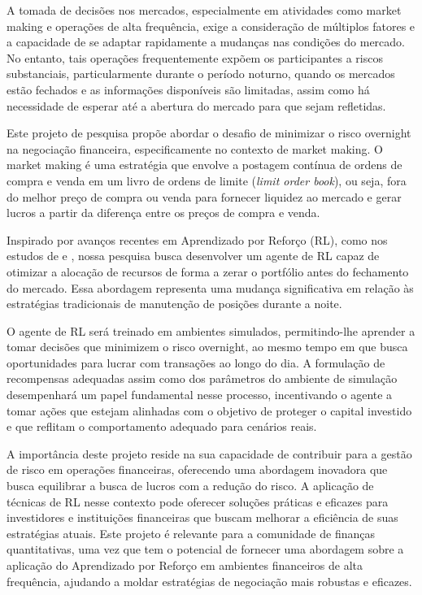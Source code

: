 A tomada de decisões nos mercados, especialmente em atividades como market making e operações de alta frequência, exige a consideração de múltiplos fatores e a capacidade de se adaptar rapidamente a mudanças nas condições do mercado. 
No entanto, tais operações frequentemente expõem os participantes a riscos substanciais, particularmente durante o período noturno, quando os mercados estão fechados e as informações disponíveis são limitadas, assim como há necessidade de esperar até a abertura do mercado para que sejam refletidas. %

Este projeto de pesquisa propõe abordar o desafio de minimizar o risco overnight na negociação financeira, especificamente no contexto de market making. O market making é uma estratégia que envolve a postagem contínua de ordens de compra e venda em um livro de ordens de limite (\textit{limit order book}), ou seja, fora do melhor preço de compra ou venda para fornecer liquidez ao mercado e gerar lucros a partir da diferença entre os preços de compra e venda.

Inspirado por avanços recentes em Aprendizado por Reforço (RL), como nos estudos de  \cite{Gasperov2021} e \cite{Ganesh2019},  nossa pesquisa busca desenvolver um agente de RL capaz de otimizar a alocação de recursos de forma a zerar o portfólio antes do fechamento do mercado. Essa abordagem representa uma mudança significativa em relação às estratégias tradicionais de manutenção de posições durante a noite.

O agente de RL será treinado em ambientes simulados, permitindo-lhe aprender a tomar decisões que minimizem o risco overnight, ao mesmo tempo em que busca oportunidades para lucrar com transações ao longo do dia. A formulação de recompensas adequadas assim como dos parâmetros do ambiente de simulação desempenhará um papel fundamental nesse processo, incentivando o agente a tomar ações que estejam alinhadas com o objetivo de proteger o capital investido e que reflitam o comportamento adequado para cenários reais.

A importância deste projeto reside na sua capacidade de contribuir para a gestão de risco em operações financeiras, oferecendo uma abordagem inovadora que busca equilibrar a busca de lucros com a redução do risco. A aplicação de técnicas de RL nesse contexto pode oferecer soluções práticas e eficazes para investidores e instituições financeiras que buscam melhorar a eficiência de suas estratégias atuais. Este projeto é relevante para a comunidade de finanças quantitativas, uma vez que tem o potencial de fornecer uma abordagem sobre a aplicação do Aprendizado por Reforço em ambientes financeiros de alta frequência, ajudando a moldar estratégias de negociação mais robustas e eficazes.

